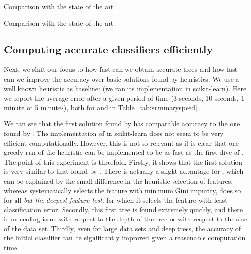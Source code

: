 \documentclass{article}
\begin{document}
\begin{table}[t]
\begin{center}
\begin{footnotesize}
\tabcolsep=3.75pt

\end{footnotesize}
\end{center}
\caption{\label{tab:summaryaccsmall} Comparison with the state of the art}
\end{table}


\begin{table}[t]
\begin{center}
\begin{footnotesize}
\tabcolsep=3pt

\end{footnotesize}
\end{center}
\caption{\label{tab:summaryaccsmall} Comparison with the state of the art}
\end{table}



\subsection{Computing accurate classifiers efficiently}

Next, we shift our focus to how fast can we obtain accurate trees and how fast can we improve the accuracy over basic solutions found by heuristics.
We use a well known heuristic as baseline: \cart (we ran its implementation in scikit-learn).
Here we report the average error after a given period of time (3 seconds, 10 seconds, 1 minute or 5 minutes), both for \murtree and \budalg in Table~\ref{tab:summaryspeed}.



We can see that the first solution found by \budalg has comparable accuracy to the one found by \cart. The implementation of \cart in scikit-learn does not seem to be very efficient computationally. However, this is not so relevant as it is clear that one greedy run of the heuristic can be implemented to be as fast as the first dive of \budalg. The point of this experiment is threefold. Firstly, it shows that the first solution is very similar to that found by \cart. There is actually a slight advantage for \budalg, which can
be explained by the small difference in the heuristic selection of features: whereas \cart systematically selects the feature with minimum Gini impurity, \budalg does so for all \emph{but the deepest feature test}, for which it selects the feature with least classification error. 
Secondly, this first tree
is found extremely quickly, and there is no scaling issue with respect to the depth of the tree or with respect to the size of the data set. Thirdly, even for large data sets and deep trees, the accuracy of the initial classifier can be significantly improved given a reasonable computation time.
\end{document}
